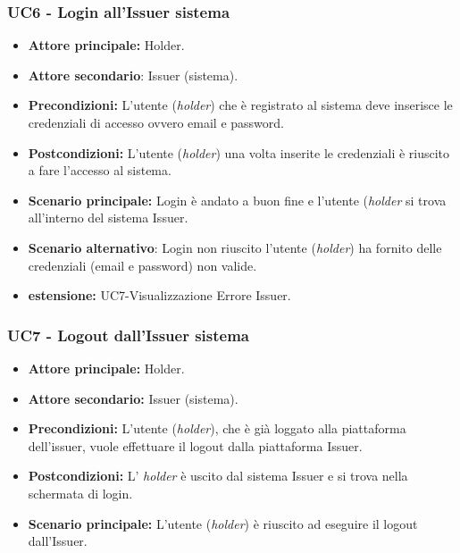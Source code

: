 \subsubsection{UC6 - Login all'Issuer sistema}
\begin{itemize}
\item \textbf{Attore principale:} Holder.
\item \textbf{Attore secondario}: Issuer (sistema). 
\item \textbf{Precondizioni:} L'utente (\textit{holder}) che è registrato al sistema deve inserisce le credenziali di accesso ovvero email e password.
\item \textbf{Postcondizioni:} L'utente (\textit{holder}) una volta inserite le credenziali è riuscito a fare l'accesso al sistema.
\item \textbf{Scenario principale:} Login è andato a buon fine e l'utente  (\textit{holder} si trova all'interno del sistema Issuer.
\item \textbf{Scenario alternativo}: Login non riuscito l'utente (\textit{holder}) ha fornito delle credenziali (email e password) non valide.
\item \textbf{estensione:} UC7-Visualizzazione Errore Issuer.
\end{itemize}

\subsubsection{UC7 - Logout dall'Issuer sistema}
\begin{itemize}
\item \textbf{Attore principale:} Holder.
\item \textbf{Attore secondario:} Issuer (sistema).
\item \textbf{Precondizioni:} L'utente (\textit{holder}), che è già loggato alla piattaforma dell'issuer,  vuole effettuare il logout dalla piattaforma Issuer.
\item \textbf{Postcondizioni:} L' \textit{holder} è uscito dal sistema Issuer e si trova nella schermata di login.
\item \textbf{Scenario principale:} L'utente (\textit{holder}) è riuscito ad eseguire il logout dall'Issuer. 
\end{itemize}

